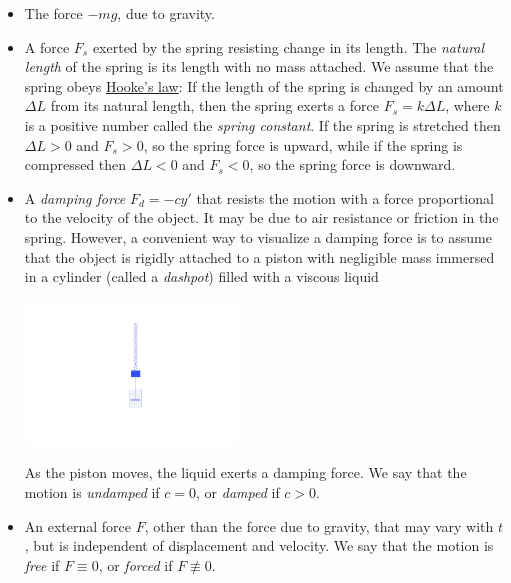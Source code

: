 \documentclass{ximera}
\begin{document}
\begin{itemize}
\item The force $-mg$, due to gravity.

\item A force $F_s$ exerted by the spring resisting change in its
length. The \textit{natural length} of the spring is its length with
no mass attached. We assume that the spring obeys
\href{http://www-history.mcs.st-and.ac.uk/Mathematicians/Hooke.html}
{Hooke's law}:
If the length of the spring is changed by an amount $\Delta L$
from its natural length,  then the spring exerts a force $F_s=k\Delta
L$, where $k$ is a positive number called the \textit{spring constant}.
If the spring is stretched then  $\Delta L>0$ and $F_s>0$, so the
spring force is upward, while if the spring is compressed then $\Delta
L<0$ and $F_s<0$, so the spring force is downward.

\item A \textit{damping force} $F_d=-cy'$ that resists the motion with
a force proportional to the velocity of the object. It may be due to
air resistance or friction in the spring. However, a convenient way to
visualize a damping force is to assume that the object is rigidly
attached to a piston with negligible mass immersed in a cylinder
(called a \textit{dashpot}) filled with a viscous liquid

\begin{image}
  \includegraphics[height=1.5in]{fig060102.jpg} 
\end{image}

As the piston moves, the liquid exerts a
damping force. We say that the motion is \textit{undamped} if $c=0$, or
\textit{damped} if $c>0$.


\item An external force $F$, other than the force due to gravity, that
may vary with $t$, but is independent of displacement and velocity. We
say that the motion is \textit{free} if $F\equiv0$, or \textit{forced}
if $F\not\equiv0$.

\end{itemize}
\end{document}
